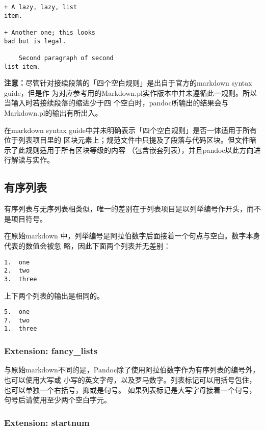 \documentclass[fancyhdr,bookmark]{ctexbook}
\begin{document}
\begin{lstlisting}
+ A lazy, lazy, list
item.

+ Another one; this looks
bad but is legal.

    Second paragraph of second
list item.
\end{lstlisting}

\textbf{注意：}尽管针对接续段落的「四个空白规则」是出自于官方的markdown
syntax guide，但是作
为对应参考用的Markdown.pl实作版本中并未遵循此一规则。所以当输入时若接续段落的缩进少于四
个空白时，pandoc所输出的结果会与Markdown.pl的输出有所出入。

在markdown syntax
guide中并未明确表示「四个空白规则」是否一体适用于所有位于列表项目里的
区块元素上；规范文件中只提及了段落与代码区块。但文件暗示了此规则适用于所有区块等级的内容
（包含嵌套列表），并且pandoc以此方向进行解读与实作。

\subsection{有序列表}\label{ux6709ux5e8fux5217ux8868}

有序列表与无序列表相类似，唯一的差别在于列表项目是以列举编号作开头，而不是项目符号。

在原始markdown
中，列举编号是阿拉伯数字后面接着一个句点与空白。数字本身代表的数值会被忽
略，因此下面两个列表并无差别：

\begin{lstlisting}
1.  one
2.  two
3.  three
\end{lstlisting}

上下两个列表的输出是相同的。

\begin{lstlisting}
5.  one
7.  two
1.  three
\end{lstlisting}

\subsubsection{Extension: fancy\_lists}\label{extension-fancyux5flists}

与原始markdown不同的是，Pandoc除了使用阿拉伯数字作为有序列表的编号外，也可以使用大写或
小写的英文字母，以及罗马数字。列表标记可以用括号包住，也可以单独一个右括号，抑或是句号。
如果列表标记是大写字母接着一个句号，句号后请使用至少两个空白字元。

\subsubsection{Extension: startnum}\label{extension-startnum}
\end{document}
